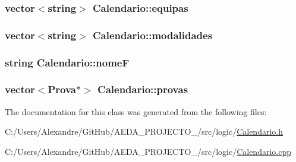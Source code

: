 \subsubsection[{equipas}]{\setlength{\rightskip}{0pt plus 5cm}vector$<$string$>$ Calendario\+::equipas\hspace{0.3cm}{\ttfamily [private]}}\label{class_calendario_a4c49ca003a72d9d1aa32fcef57066467}
\hypertarget{class_calendario_a6a492724444ed6b468fe230d09fd800b}{}
\subsubsection[{modalidades}]{\setlength{\rightskip}{0pt plus 5cm}vector$<$string$>$ Calendario\+::modalidades\hspace{0.3cm}{\ttfamily [private]}}\label{class_calendario_a6a492724444ed6b468fe230d09fd800b}
\hypertarget{class_calendario_ad14a413cc8b38380f6ea80f921cd16b4}{}
\subsubsection[{nome\+F}]{\setlength{\rightskip}{0pt plus 5cm}string Calendario\+::nome\+F\hspace{0.3cm}{\ttfamily [private]}}\label{class_calendario_ad14a413cc8b38380f6ea80f921cd16b4}
\hypertarget{class_calendario_a1c917a3325a0ebd6cbe186e976326d06}{}
\subsubsection[{provas}]{\setlength{\rightskip}{0pt plus 5cm}vector$<${\bf Prova}$\ast$$>$ Calendario\+::provas\hspace{0.3cm}{\ttfamily [private]}}\label{class_calendario_a1c917a3325a0ebd6cbe186e976326d06}


The documentation for this class was generated from the following files\+:\begin{DoxyCompactItemize}
\item 
C\+:/\+Users/\+Alexandre/\+Git\+Hub/\+A\+E\+D\+A\+\_\+\+P\+R\+O\+J\+E\+C\+T\+O\+\_/src/logic/\hyperlink{_calendario_8h}{Calendario.\+h}\item 
C\+:/\+Users/\+Alexandre/\+Git\+Hub/\+A\+E\+D\+A\+\_\+\+P\+R\+O\+J\+E\+C\+T\+O\+\_/src/logic/\hyperlink{_calendario_8cpp}{Calendario.\+cpp}\end{DoxyCompactItemize}
